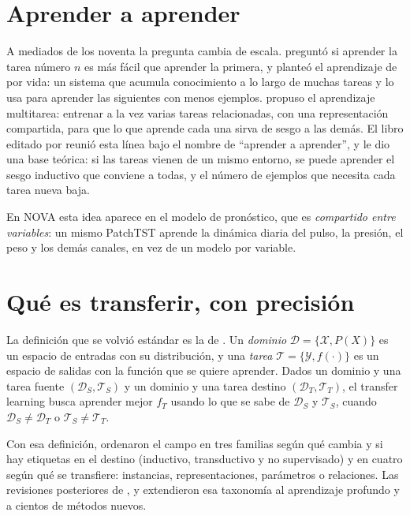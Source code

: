 \section{Aprender a aprender}

A mediados de los noventa la pregunta cambia de escala. \textcite{thrun1996} preguntó si aprender la tarea número $n$
es más fácil que aprender la primera, y planteó el aprendizaje de por vida: un sistema que acumula conocimiento a lo
largo de muchas tareas y lo usa para aprender las siguientes con menos ejemplos. \textcite{caruana1997} propuso el
aprendizaje multitarea: entrenar a la vez varias tareas relacionadas, con una representación compartida, para que lo
que aprende cada una sirva de sesgo a las demás. El libro editado por \textcite{thrun1998} reunió esta línea bajo el
nombre de \enquote{aprender a aprender}, y \textcite{baxter2000} le dio una base teórica: si las tareas vienen de un
mismo entorno, se puede aprender el sesgo inductivo que conviene a todas, y el número de ejemplos que necesita cada
tarea nueva baja.

En NOVA esta idea aparece en el modelo de pronóstico, que es \emph{compartido entre variables}: un mismo PatchTST
aprende la dinámica diaria del pulso, la presión, el peso y los demás canales, en vez de un modelo por variable.

\section{Qué es transferir, con precisión}\label{sec:definicion}

La definición que se volvió estándar es la de \textcite{pan2010}. Un \emph{dominio} $\mathcal{D} = \{\mathcal{X},
P(X)\}$ es un espacio de entradas con su distribución, y una \emph{tarea} $\mathcal{T} = \{\mathcal{Y}, f(\cdot)\}$ es
un espacio de salidas con la función que se quiere aprender. Dados un dominio y una tarea fuente
$(\mathcal{D}_S, \mathcal{T}_S)$ y un dominio y una tarea destino $(\mathcal{D}_T, \mathcal{T}_T)$, el transfer
learning busca aprender mejor $f_T$ usando lo que se sabe de $\mathcal{D}_S$ y $\mathcal{T}_S$, cuando
$\mathcal{D}_S \neq \mathcal{D}_T$ o $\mathcal{T}_S \neq \mathcal{T}_T$.

Con esa definición, \textcite{pan2010} ordenaron el campo en tres familias según qué cambia y si hay etiquetas en el
destino (inductivo, transductivo y no supervisado) y en cuatro según qué se transfiere: instancias, representaciones,
parámetros o relaciones. Las revisiones posteriores de \textcite{weiss2016}, \textcite{tan2018} y
\textcite{zhuang2021} extendieron esa taxonomía al aprendizaje profundo y a cientos de métodos nuevos.

